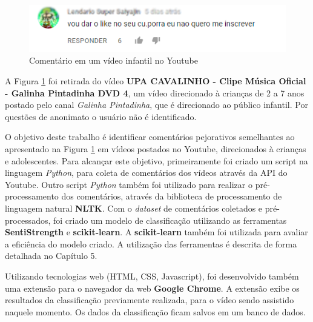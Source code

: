 \begin{figure}[H] %
	\caption{\label{fig:youtube_comment} Comentário em um vídeo infantil no Youtube}
	\begin{center}
	    \includegraphics[scale=1]{figuras/figura_1.png} %
	\end{center}
\end{figure}

A Figura \ref{fig:youtube_comment} foi retirada do vídeo \textbf{UPA CAVALINHO - Clipe Música Oficial - Galinha Pintadinha DVD 4}, um vídeo direcionado à crianças de 2 a 7 anos postado pelo canal \emph{Galinha Pintadinha}, que é direcionado ao público infantil. Por questões de anonimato o usuário não é identificado. %


O objetivo deste trabalho é identificar comentários pejorativos semelhantes ao apresentado na Figura \ref{fig:youtube_comment} em vídeos postados no Youtube, direcionados à crianças e adolescentes. Para alcançar este objetivo, primeiramente foi criado um script na linguagem \textit{Python}, para coleta de comentários dos vídeos através da API do Youtube. Outro script \textit{Python} também foi utilizado para realizar o pré-processamento dos comentários, através da biblioteca de processamento de linguagem natural \textbf{NLTK}. Com o \textit{dataset} de comentários coletados e pré-processados, foi criado um modelo de classificação utilizando as ferramentas \textbf{SentiStrength} e \textbf{scikit-learn}. A \textbf{scikit-learn} também foi utilizada para avaliar a eficiência do modelo criado. A utilização das ferramentas é descrita de forma detalhada no Capítulo 5. 

Utilizando tecnologias web (HTML, CSS, Javascript), foi desenvolvido também uma extensão para o navegador da web \textbf{Google Chrome}. A extensão exibe os resultados da classificação previamente realizada, para o vídeo sendo assistido naquele momento. Os dados da classificação ficam salvos em um banco de dados. 

